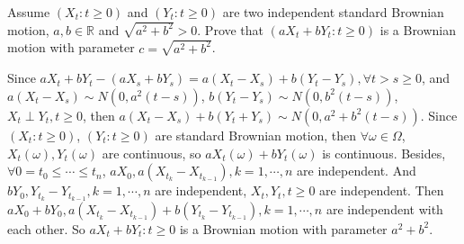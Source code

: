 \documentclass{ctexart}
\begin{document}
\begin{problem}\label{pro:3}
  Assume \((X_t:t \geq 0)\) and \((Y_t:t \geq 0)\) are two independent standard Brownian motion, \(a,b \in \mathbb{R}\) and \(\sqrt{a^2 + b^2} >0\).
  Prove that \((aX_t + bY_t:t \geq 0)\) is a Brownian motion with parameter \(c=\sqrt{a^2 + b^2}\).
\end{problem}
\begin{solution}
  Since \(aX_t + b Y_t-(a X_{s} + b Y_s) = a (X_t - X_s) + b (Y_t - Y_s), \forall t >s \geq 0\), and \(a(X_t - X_s) \sim N(0,a^2(t-s))\),
  \(b(Y_t-Y_s) \sim N(0, b^2(t-s))\), \(X_t \perp Y_t, t \geq 0\), then \(a(X_t-X_s)+b(Y_t + Y_s) \sim N(0, a^2 + b^2(t-s))\).
  Since \((X_t:t \geq 0)\), \((Y_t:t \geq 0)\) are standard Brownian motion, then \(\forall \omega \in \Omega\), \(X_t(\omega), Y_t(\omega)\) are continuous,
  so \(aX_t(\omega)+bY_t(\omega)\) is continuous.
  Besides, \(\forall 0 = t_0 \leq \cdots \leq t_n\), \(aX_0,a(X_{t_k}-X_{t_{k-1}}), k=1,\cdots,n\) are independent.
  And \(bY_0,Y_{t_k}-Y_{t_{k-1}}, k=1,\cdots,n\) are independent, \(X_t,Y_t, t \geq 0\) are independent.
  Then \(aX_0+bY_0, a(X_{t_k}-X_{t_{k-1}})+b(Y_{t_k}-Y_{t_{k-1}}), k=1,\cdots,n\) are independent with each other.
  So \(aX_t + bY_t: t \geq 0\) is a Brownian motion with parameter \(a^2 + b^2\).
\end{solution}
\end{document}
